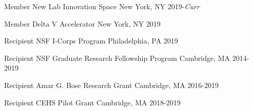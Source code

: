 


\begin{cvhonors}

  \cvhonor
    {Member} %
    {New Lab Innovation Space} %
    {New York, NY} %
    {2019-\textit{Curr}} %

  \cvhonor
    {Member} %
    {Delta V Accelerator} %
    {New York, NY} %
    {\qquad{}2019} %

  \cvhonor
    {Recipient} %
    {NSF I-Corps Program} %
    {Philadelphia, PA} %
    {\qquad{}2019} %

  \cvhonor
    {Recipient} %
    {NSF Graduate Research Fellowship Program} %
    {Cambridge, MA} %
    {2014-2019} %

  \cvhonor
    {Recipient} %
    {Amar G. Bose Research Grant} %
    {Cambridge, MA} %
    {2016-2019} %

  \cvhonor
    {Recipient} %
    {CEHS Pilot Grant} %
    {Cambridge, MA} %
    {2018-2019} %


\end{cvhonors}
